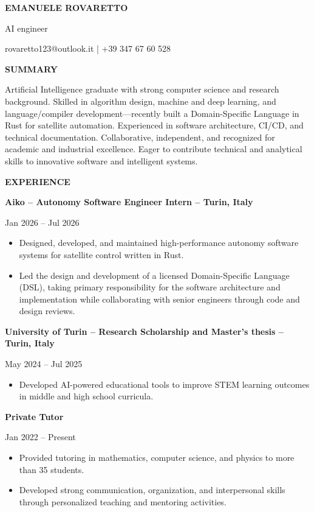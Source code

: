 \documentclass[11pt]{article}
\begin{document}
\textbf{EMANUELE ROVARETTO}

AI engineer

rovaretto123@outlook.it | +39 347 67 60 528
\vspace{8mm}

\textbf{SUMMARY}

Artificial Intelligence graduate with strong computer science and research background. Skilled in algorithm design, machine and deep learning, and language/compiler development—recently built a Domain-Specific Language in Rust for satellite automation. Experienced in software architecture, CI/CD, and technical documentation. Collaborative, independent, and recognized for academic and industrial excellence. Eager to contribute technical and analytical skills to innovative software and intelligent systems.
\vspace{8mm}

\textbf{EXPERIENCE}

\textbf{Aiko – Autonomy Software Engineer Intern – Turin, Italy}

Jan 2026 – Jul 2026
\begin{itemize}
    \item Designed, developed, and maintained high-performance autonomy software systems for satellite control written in Rust.
    \item Led the design and development of a licensed Domain-Specific Language (DSL), taking primary responsibility for the software architecture and implementation while collaborating with senior engineers through code and design reviews.
\end{itemize}

\textbf{University of Turin – Research Scholarship and Master's thesis – Turin, Italy}

May 2024 – Jul 2025
\begin{itemize}
    \item Developed AI-powered educational tools to improve STEM learning outcomes in middle and high school curricula.
\end{itemize}

\textbf{Private Tutor}

Jan 2022 – Present
\begin{itemize}
    \item Provided tutoring in mathematics, computer science, and physics to more than 35 students.
    \item Developed strong communication, organization, and interpersonal skills through personalized teaching and mentoring activities.
\end{itemize}
\end{document}
